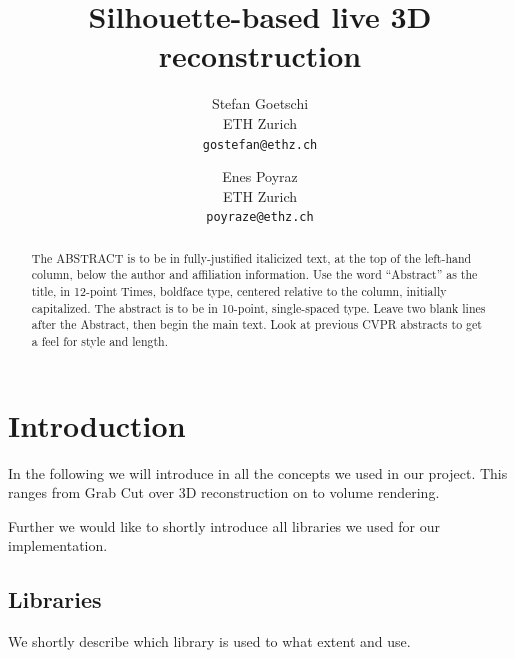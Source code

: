 \documentclass[10pt,twocolumn,letterpaper]{article}
\begin{document}
\title{Silhouette-based live 3D reconstruction}

\author{Stefan Goetschi\\
ETH Zurich\\
{\tt\small gostefan@ethz.ch}
\and
Enes Poyraz\\
ETH Zurich\\
{\tt\small poyraze@ethz.ch}
}

\maketitle

\begin{abstract}
   The ABSTRACT is to be in fully-justified italicized text, at the top
   of the left-hand column, below the author and affiliation
   information. Use the word ``Abstract'' as the title, in 12-point
   Times, boldface type, centered relative to the column, initially
   capitalized. The abstract is to be in 10-point, single-spaced type.
   Leave two blank lines after the Abstract, then begin the main text.
   Look at previous CVPR abstracts to get a feel for style and length.
\end{abstract}

\section{Introduction}

In the following we will introduce in all the concepts we used in our project. This ranges from Grab Cut over 3D reconstruction on to volume rendering.

Further we would like to shortly introduce all libraries we used for our implementation.

\subsection{Libraries}

We shortly describe which library is used to what extent and use.
\end{document}
